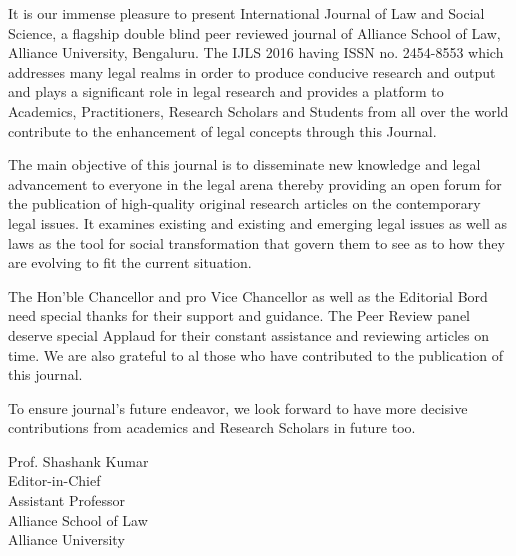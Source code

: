 
\setcounter{figure}{0}
\setcounter{table}{0}
\setcounter{footnote}{0}

\label{2016-editorial}


\noi
It is our immense pleasure to present International Journal of Law and Social Science, a flagship double blind peer reviewed journal of Alliance School of Law, Alliance University, Bengaluru. The IJLS 2016 having ISSN no. 2454-8553 which addresses many legal realms in order to produce conducive research and output and plays a significant role in legal research and provides a platform to Academics, Practitioners, Research Scholars and Students from all over the world contribute to the enhancement of legal concepts through this Journal. 

\noi
The main objective of this journal is to disseminate new knowledge and legal advancement to everyone in the legal arena thereby providing an open forum for the publication of high-quality original research articles on the contemporary legal issues. It examines existing and existing and emerging legal issues as well as laws as the tool for social transformation that govern them to see as to how they are evolving to fit the current situation.

\noi
The Hon’ble Chancellor and pro Vice Chancellor as well as the Editorial Bord need special thanks for their support and guidance. The Peer Review panel deserve special Applaud for their constant assistance and reviewing articles on time. We are also grateful to al those who have contributed to the publication of this journal.

\noi
To ensure journal’s future endeavor, we look forward to have more decisive contributions from academics and Research Scholars in future too. 

\begin{flushright}
Prof. Shashank Kumar\\
Editor-in-Chief\\
Assistant Professor\\
Alliance School of Law\\
Alliance University
\end{flushright}
